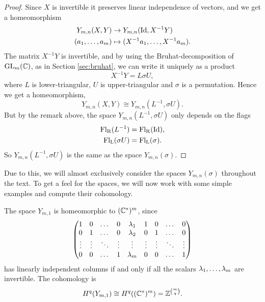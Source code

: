 \begin{proof}
  Since $X$ is invertible it preserves linear independence of vectors,
  and we get a homeomorphism
  \begin{align*}
    Y_{m,n}(X,Y) &\to Y_{m,n}(\operatorname{Id},X^{-1}Y) \\
    (a_1,\dots,a_m) &\mapsto (X^{-1}a_1,\dots,X^{-1}a_m).
  \end{align*}
  The matrix $X^{-1}Y$ is invertible, and by using the
  Bruhat-decomposition of $\operatorname{GL}_m(\mathbb{C})$, as in Section \ref{sec:bruhat},
  we can write it uniquely as a product 
  \[ X^{-1}Y = L\sigma U, \]
  where $L$ is lower-triangular, $U$ is upper-triangular and $\sigma$
  is a permutation. Hence we get a homeomorphism,
  \[ Y_{m,n}(X,Y) \cong Y_{m,n}(L^{-1}, \sigma U). \]
  But by the remark above, the space $Y_{m,n}(L^{-1},\sigma U)$ only
  depends
  on the flags 
  \begin{align*}
    \mathrm{Fl_R}(L^{-1}) &= \mathrm{Fl_R}(\operatorname{Id}), \\
    \mathrm{Fl_L}(\sigma U) &= \mathrm{Fl_L}(\sigma).
  \end{align*}
  So $Y_{m,n}(L^{-1},\sigma U)$ is the same as the space
  $Y_{m,n}(\sigma)$.
\end{proof}

Due to this, we will almost exclusively consider the spaces
$Y_{m,n}(\sigma)$ throughout the text. To get a feel for the spaces,
we will now work with some simple examples and compute their
cohomology.

\begin{example}
  \label{ex:n=1}

  The space $Y_{m,1}$ is homeomorphic to $(\mathbb{C}^*)^m$, since
  \[\begin{pmatrix}
    1&0&\dots&0&\lambda_1&1&0&\dots&0 \\
    0&1&\dots&0&\lambda_2&0&1&\dots&0 \\
    \vdots&\vdots&\ddots&\vdots&\vdots&\vdots&\vdots&\ddots&\vdots \\
    0&0&\dots&1&\lambda_m&0&0&\dots&1
  \end{pmatrix} \]
  has linearly independent columns if and only if all the scalars
  $\lambda_1,\dots,\lambda_m$ are invertible. The cohomology is
  \[ H^q(Y_{m,1}) \cong H^q((\mathbb{C}^*)^m) = \mathbb{Z}^{{m \choose q}}. \]
\end{example}


